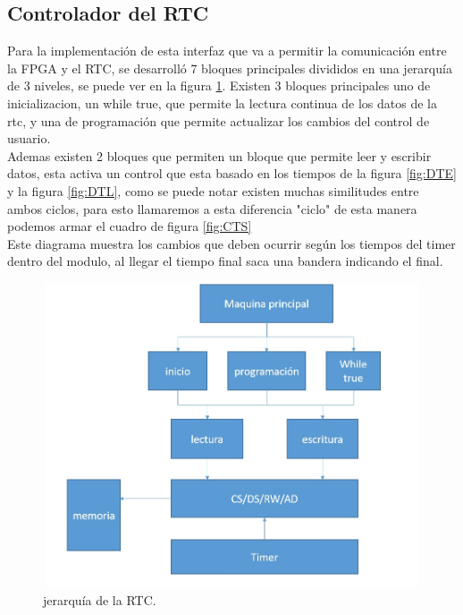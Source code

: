 \documentclass[12pt,a4paper]{article}
\begin{document}
\subsection{Controlador del RTC}
Para la implementación de esta interfaz que va a permitir la comunicación entre la FPGA y el RTC, se desarrolló 7 bloques principales divididos en una jerarquía de 3 niveles, se puede ver en la figura \ref{fig:Jrtc}. Existen 3 bloques principales uno de inicializacion, un while true, que permite la lectura continua de los datos de la rtc, y una de programación que permite actualizar los cambios del control de usuario.\\ [2ex]
 Ademas existen 2 bloques que permiten un bloque que permite leer y escribir datos, esta activa un control que esta basado en los tiempos de la figura \ref{fig:DTE} y la figura \ref{fig:DTL}, como se puede notar existen muchas similitudes entre ambos ciclos, para esto llamaremos a esta diferencia "ciclo" de esta manera podemos armar el cuadro de figura \ref{fig:CTS}\\[2ex]
 Este diagrama muestra los cambios que deben ocurrir según los tiempos del timer dentro del modulo, al llegar el tiempo final saca una bandera indicando el final.\\ [2ex]
\begin{figure}[htbp]
  \centering
    \includegraphics[height=9cm, width=16cm]{img/JerarquiaRTC.jpg}
  \caption[3erNivel]{jerarquía de la RTC.}
  \label{fig:Jrtc}
\end{figure}
\end{document}
